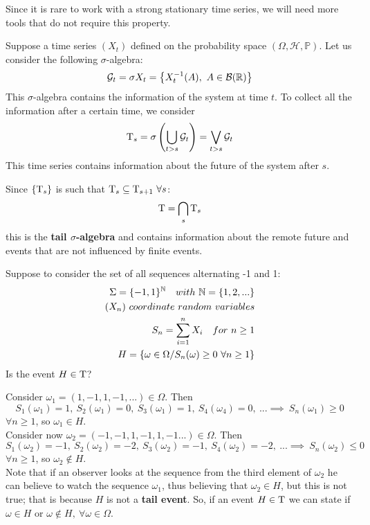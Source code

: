 Since it is rare to work with a strong stationary time series, we will need more tools that do not require this property.

\begin{definition}
    Suppose a time series $(X_t)$ defined on the probability space $(\Omega,\mathcal{H},\mathbb{P})$. Let us consider the following $\sigma$-algebra:
    \[
        \mathcal{G}_t=\sigma X_t=\left\{X_t^{-1}(A),\ A\in\mathcal{B}(\mathbb{R})\right\}  
    \]
    This $\sigma$-algebra contains the information of the system at time $t$. To collect all the information after a certain time, we consider
    \[
        \mathrm{T}_s=\sigma\left(\bigcup_{t>s}\mathcal{G}_t\right)=\bigvee_{t>s}\mathcal{G}_t
    \]
    This time series contains information about the future of the system after $s$.

    Since $\{\mathrm{T}_s\}$ is such that $\mathrm{T}_s\subseteq\mathrm{T}_{s+1}\ \forall s$:
    \[
        \mathrm{T}=\bigcap_s\mathrm{T}_s  
    \]
    this is the \textbf{tail $\sigma$-algebra} and contains information about the remote future and events that are not influenced by finite events.
\end{definition}

\begin{example}
    Suppose to consider the set of all sequences alternating -1 and 1:
    \begin{equation*}
        \begin{split}
            \Sigma=\{-1,1\}^{\mathbb{N}}\ \ \ with\ \mathbb{N}=\{1,2,...\}\\
            (X_n)\ coordinate\ random\ variables\\
            S_n=\sum_{i=1}^nX_i\ \ \ for\ n\ge1\\
            H=\{\omega\in\Omega/S_n(\omega)\ge0\ \forall n\ge1\}\\
        \end{split}
    \end{equation*}
    Is the event $H\in\mathrm{T}$?
    
    Consider $\omega_1=(1,-1,1,-1,...)\in\Omega$. Then
    \[
        S_1(\omega_1)=1,\ S_2(\omega_1)=0,\ S_3(\omega_1)=1,\ S_4(\omega_4)=0,\ ...\implies\ S_n(\omega_1)\ge0
    \]
    $\forall n\ge1$, so $\omega_1\in H$.\\
    Consider now $\omega_2=(-1,-1,1,-1,1,-1...)\in\Omega$. Then
    \[
        S_1(\omega_2)=-1,\ S_2(\omega_2)=-2,\ S_3(\omega_2)=-1,\ S_4(\omega_2)=-2,\ ...\implies\ S_n(\omega_2)\le0
    \]
    $\forall n\ge1$, so $\omega_2\notin H$.\\
    Note that if an observer looks at the sequence from the third element of $\omega_2$ he can believe to watch the sequence $\omega_1$, thus believing that $\omega_2\in H$, but this is not true; that is because $H$ is not a \textbf{tail event}. So, if an event $H\in\mathrm{T}$ we can state if $\omega\in H$ or $\omega\notin H,\ \forall\omega\in\Omega$.
\end{example}


